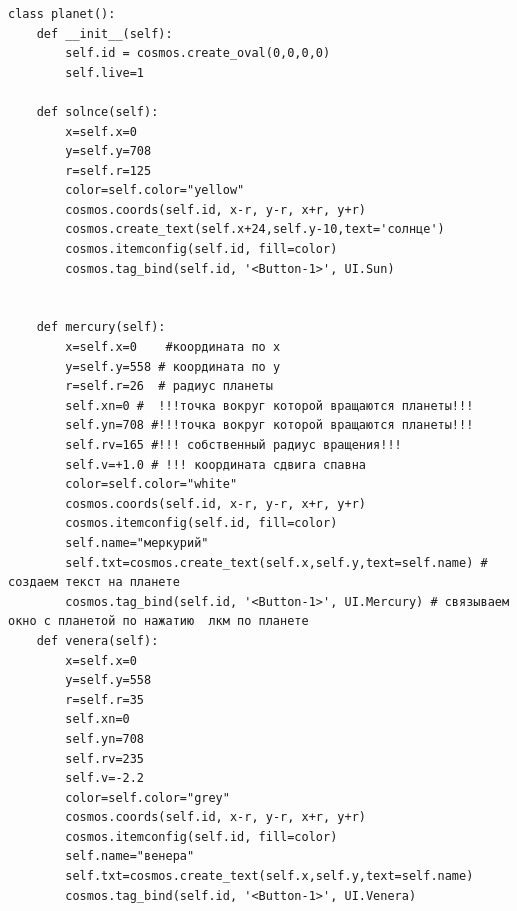 \documentclass[11pt,a4paper]{report}
\begin{document}
\begin{verbatim}
     









class planet():
    def __init__(self):
        self.id = cosmos.create_oval(0,0,0,0)
        self.live=1
        
    def solnce(self):
        x=self.x=0
        y=self.y=708
        r=self.r=125
        color=self.color="yellow"
        cosmos.coords(self.id, x-r, y-r, x+r, y+r)
        cosmos.create_text(self.x+24,self.y-10,text='солнце')
        cosmos.itemconfig(self.id, fill=color)
        cosmos.tag_bind(self.id, '<Button-1>', UI.Sun)
      
        
    def mercury(self):
        x=self.x=0    #координата по х
        y=self.y=558 # координата по у
        r=self.r=26  # радиус планеты
        self.xn=0 #  !!!точка вокруг которой вращаются планеты!!!
        self.yn=708 #!!!точка вокруг которой вращаются планеты!!!
        self.rv=165 #!!! собственный радиус вращения!!!
        self.v=+1.0 # !!! координата сдвига спавна 
        color=self.color="white"
        cosmos.coords(self.id, x-r, y-r, x+r, y+r)
        cosmos.itemconfig(self.id, fill=color) 
        self.name="меркурий"
        self.txt=cosmos.create_text(self.x,self.y,text=self.name) # создаем текст на планете
        cosmos.tag_bind(self.id, '<Button-1>', UI.Mercury) # связываем окно с планетой по нажатию  лкм по планете
    def venera(self):
        x=self.x=0
        y=self.y=558
        r=self.r=35
        self.xn=0
        self.yn=708
        self.rv=235
        self.v=-2.2
        color=self.color="grey"
        cosmos.coords(self.id, x-r, y-r, x+r, y+r)
        cosmos.itemconfig(self.id, fill=color)
        self.name="венера"
        self.txt=cosmos.create_text(self.x,self.y,text=self.name)
        cosmos.tag_bind(self.id, '<Button-1>', UI.Venera)
    

\end{verbatim}
\end{document}
